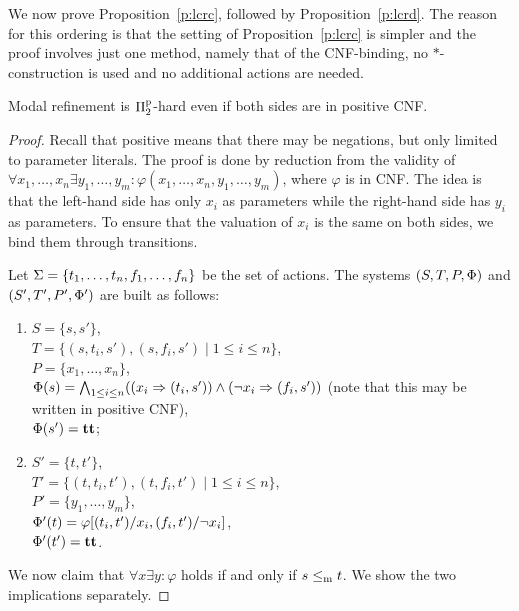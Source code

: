 We now prove Proposition~\ref{p:lcrc}, followed by Proposition~\ref{p:lcrd}. The reason
for this ordering is that the setting of Proposition~\ref{p:lcrc} is simpler and the
proof involves just one method, namely that of the CNF-binding, 
no $*$-construction is used and no additional actions are needed.


\begin{proposition}\label{p:lcrc}
Modal refinement is $\mathrm\Pi^\mathrm p_2$-hard even if both sides are in positive CNF.
\end{proposition}
\begin{proof}
Recall that positive means that there may be negations, but only limited
to parameter literals.
The proof is done by reduction from the validity of \linebreak  
$\forall x_1, \ldots, x_n \exists y_1, \ldots, y_m : 
\varphi(x_1, \ldots, x_n, y_1, \ldots, y_m)$, where $\varphi$ is in CNF.
The idea is that the left-hand side has only $x_i$ as parameters
while the right-hand side has $y_i$ as parameters.
To ensure that the valuation of $x_i$ is the same
on both sides, we bind them through transitions.

Let 
$\mathrm{\Sigma} = \{t_1, \ldots, t_n, f_1, \ldots, f_n\}$
be the set of actions.
The systems $(S,T,P,\mathrm{\Phi})$ and $(S',T',P',\mathrm{\Phi}')$ are built as follows: 
\begin{enumerate}
    \item $S = \{s, s'\}$,\\ 
    $T = \{(s,t_i,s'), (s,f_i,s') \mid
1 \le i \le n \}$,\\ 
    $P = \{x_1, \ldots, x_n\}$,\\
    $\mathrm{\Phi}(s) = \bigwedge_{1 \le i \le n} ((x_i \Rightarrow (t_i,s')) \wedge (\neg x_i \Rightarrow (f_i,s'))$ (note that this may be written in positive CNF),\\
    $\mathrm{\Phi}(s') = \mathbf{tt}$;
    \item $S' = \{ t, t' \}$,\\
    $T' = \{ (t,t_i,t'), (t,f_i,t') \mid 1 \le i \le n \}$,\\
    $P' = \{y_1, \ldots, y_m\}$,\\

    $\mathrm{\Phi}'(t) = \varphi[(t_i,t')/x_i,(f_i,t')/\neg x_i]$,\\

    $\mathrm{\Phi}'(t') = \mathbf{tt}$.
\end{enumerate}



We now claim that $\forall x \exists y : \varphi$ holds
if and only if $s \le_\mathrm m t$.
We show the two implications separately. 


\end{proof}
